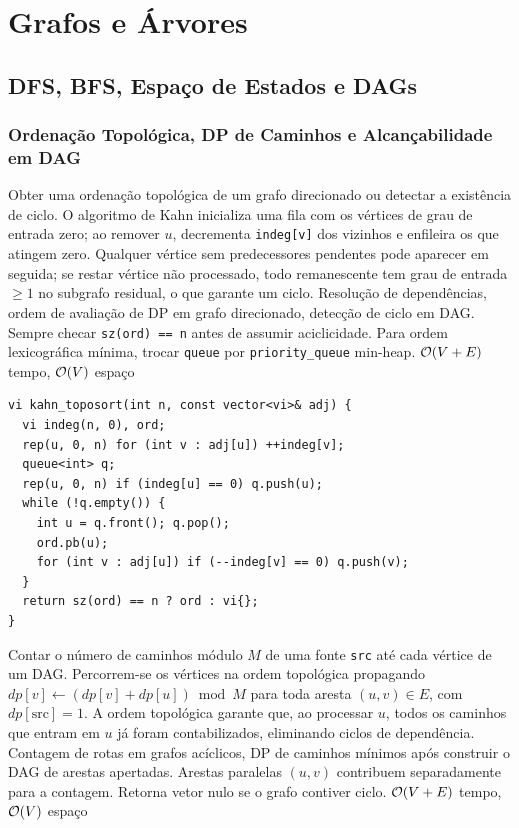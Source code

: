 \section{Grafos e Árvores}

\subsection{DFS, BFS, Espaço de Estados e DAGs}

\subsubsection{Ordenação Topológica, DP de Caminhos e Alcançabilidade em DAG}
\algobox
  {Obter uma ordenação topológica de um grafo direcionado ou detectar a existência de ciclo.}
  {O algoritmo de Kahn inicializa uma fila com os vértices de grau de entrada zero; ao remover $u$, decrementa \texttt{indeg[v]} dos vizinhos e enfileira os que atingem zero.}
  {Qualquer vértice sem predecessores pendentes pode aparecer em seguida; se restar vértice não processado, todo remanescente tem grau de entrada $\ge 1$ no subgrafo residual, o que garante um ciclo.}
  {Resolução de dependências, ordem de avaliação de DP em grafo direcionado, detecção de ciclo em DAG.}
  {Sempre checar \texttt{sz(ord) == n} antes de assumir aciclicidade. Para ordem lexicográfica mínima, trocar \texttt{queue} por \texttt{priority\_queue} min-heap.}
  {$\mathcal{O}(V + E)$ tempo, $\mathcal{O}(V)$ espaço}

\begin{lstlisting}
vi kahn_toposort(int n, const vector<vi>& adj) {
  vi indeg(n, 0), ord;
  rep(u, 0, n) for (int v : adj[u]) ++indeg[v];
  queue<int> q;
  rep(u, 0, n) if (indeg[u] == 0) q.push(u);
  while (!q.empty()) {
    int u = q.front(); q.pop();
    ord.pb(u);
    for (int v : adj[u]) if (--indeg[v] == 0) q.push(v);
  }
  return sz(ord) == n ? ord : vi{};
}
\end{lstlisting}

\algobox
  {Contar o número de caminhos módulo $M$ de uma fonte \texttt{src} até cada vértice de um DAG.}
  {Percorrem-se os vértices na ordem topológica propagando $dp[v] \leftarrow (dp[v] + dp[u]) \bmod M$ para toda aresta $(u, v) \in E$, com $dp[\text{src}] = 1$.}
  {A ordem topológica garante que, ao processar $u$, todos os caminhos que entram em $u$ já foram contabilizados, eliminando ciclos de dependência.}
  {Contagem de rotas em grafos acíclicos, DP de caminhos mínimos após construir o DAG de arestas apertadas.}
  {Arestas paralelas $(u, v)$ contribuem separadamente para a contagem. Retorna vetor nulo se o grafo contiver ciclo.}
  {$\mathcal{O}(V + E)$ tempo, $\mathcal{O}(V)$ espaço}


